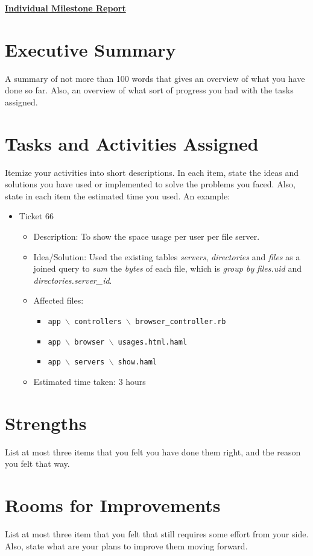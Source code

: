 \documentclass{article}
\begin{document}
\pagestyle{headings}

\begin{center}
{\LARGE\textbf{\underline{{Individual Milestone Report}}}}
\end{center}

\section*{Executive Summary}

A summary of not more than 100 words that gives an overview of what you have done so far. Also, an overview of what sort of progress you had with the tasks assigned. 

\section*{Tasks and Activities Assigned}

Itemize your activities into short descriptions. In each item, state the ideas and solutions you have used or implemented to solve the problems you faced. Also, state in each item the estimated time you used. An example:

\begin{itemize}
	\item Ticket 66
		\begin{itemize}
			\item Description: To show the space usage per user per file server.
			\item Idea/Solution: Used the existing tables \textsl{servers}, \textsl{directories} and \textsl{files} as a joined query to \textsl{sum} the \textsl{bytes} of each file, which is \textsl{group by} \textsl{files.uid} and \textsl{directories.server\_id}. 
			\item Affected files: 
				\begin{itemize}
					\item \tt{app $\backslash$ controllers $\backslash$ browser\_controller.rb}
					\item \tt{app $\backslash$ browser $\backslash$ usages.html.haml}
					\item \tt{app $\backslash$ servers $\backslash$ show.haml}
				\end{itemize}
			\item Estimated time taken: 3 hours
		\end{itemize}
\end{itemize}

\section*{Strengths}

List at most three items that you felt you have done them right, and the reason you felt that way. 

\section*{Rooms for Improvements}

List at most three item that you felt that still requires some effort from your side. Also, state what are your plans to improve them moving forward. 
\end{document}
